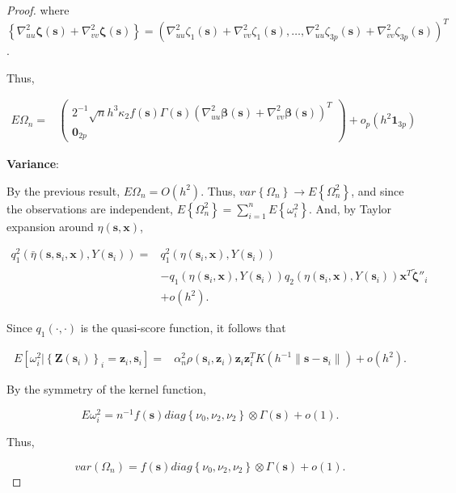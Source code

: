 \documentclass[authoryear,review, 12pt]{elsarticle}
\begin{document}
\begin{proof}
where $\left\{ \nabla_{uu}^{2}\bm{\zeta}\left(\bm{s}\right)+\nabla_{vv}^{2}\bm{\zeta}\left(\bm{s}\right)\right\} =\left(\nabla_{uu}^{2}\zeta_{1}\left(\bm{s}\right)+\nabla_{vv}^{2}\zeta_{1}\left(\bm{s}\right),\dots,\nabla_{uu}^{2}\zeta_{3p}\left(\bm{s}\right)+\nabla_{vv}^{2}\zeta_{3p}\left(\bm{s}\right)\right)^{T}$.

Thus,

\begin{align*}
E\Omega_{n}= & \left(\begin{array}{c}
2^{-1}\sqrt{n}h^{3}\kappa_{2}f\left(\bm{s}\right)\Gamma\left(\bm{s}\right)\left(\nabla_{uu}^{2}\bm{\beta}\left(\bm{s}\right)+\nabla_{vv}^{2}\bm{\beta}\left(\bm{s}\right)\right)^{T}\\
\bm{0}_{2p}
\end{array}\right)+o_{p}\left(h^{2}\bm{1}_{3p}\right)
\end{align*}


\textbf{Variance}:

By the previous result, $E\Omega_{n}=O\left(h^{2}\right)$. Thus,
$var\left\{ \Omega_{n}\right\} \to E\left\{ \Omega_{n}^{2}\right\} $,
and since the observations are independent, $E\left\{ \Omega_{n}^{2}\right\} =\sum_{i=1}^{n}E\left\{ \omega_{i}^{2}\right\} $.
And, by Taylor expansion around $\eta\left(\bm{s},\bm{x}\right)$, 

\begin{align*}
q_{1}^{2}\left(\bar{\eta}\left(\bm{s},\bm{s}_{i},\bm{x}\right),Y\left(\bm{s}_{i}\right)\right)= & q_{1}^{2}\left(\eta\left(\bm{s}_{i},\bm{x}\right),Y\left(\bm{s}_{i}\right)\right)\\
 & -q_{1}\left(\eta\left(\bm{s}_{i},\bm{x}\right),Y\left(\bm{s}_{i}\right)\right)q_{2}\left(\eta\left(\bm{s}_{i},\bm{x}\right),Y\left(\bm{s}_{i}\right)\right)\bm{x}^{T}\tilde{\bm{\zeta}}''_{i}\\
 & +o\left(h^{2}\right).
\end{align*}


Since $q_{1}\left(\cdot,\cdot\right)$ is the quasi-score function,
it follows that 

\begin{align*}
E\left[\omega_{i}^{2}|\left\{ \bm{Z}\left(\bm{s}_{i}\right)\right\} _{i}=\bm{z}_{i},\bm{s}_{i}\right]= & \alpha_{n}^{2}\rho\left(\bm{s}_{i},\bm{z}_{i}\right)\bm{z}_{i}\bm{z}_{i}^{T}K\left(h^{-1}\|\bm{s}-\bm{s}_{i}\|\right)+o\left(h^{2}\right).
\end{align*}


By the symmetry of the kernel function,

\[
E\omega_{i}^{2}=n^{-1}f\left(\bm{s}\right)diag\left\{ \nu_{0},\nu_{2},\nu_{2}\right\} \otimes\Gamma\left(\bm{s}\right)+o\left(1\right).
\]


Thus, 

\[
var\left(\Omega_{n}\right)=f\left(\bm{s}\right)diag\left\{ \nu_{0},\nu_{2},\nu_{2}\right\} \otimes\Gamma\left(\bm{s}\right)+o\left(1\right).
\]

\end{proof}
\end{document}
